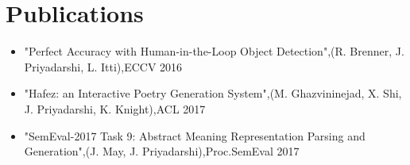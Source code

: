 \newcommand\textlcsc[1]{\textsc{\MakeTextLowercase{#1}}}
\section{Publications}
\begin{itemize}
\setlength\itemsep{-5pt}
\item "Perfect Accuracy with Human-in-the-Loop Object Detection",(R. Brenner, J. Priyadarshi, L. Itti),ECCV 2016
\item "Hafez: an Interactive Poetry Generation System",(M. Ghazvininejad, X. Shi, J. Priyadarshi, K. Knight),ACL 2017
\item "SemEval-2017 Task 9: Abstract Meaning Representation Parsing and Generation",(J. May, J. Priyadarshi),Proc.SemEval 2017
\end{itemize}
